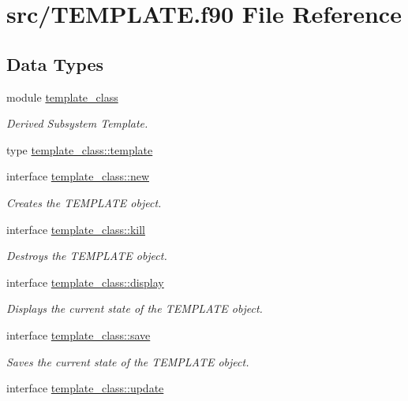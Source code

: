 \hypertarget{_t_e_m_p_l_a_t_e_8f90}{\section{src/\-T\-E\-M\-P\-L\-A\-T\-E.f90 File Reference}
\label{_t_e_m_p_l_a_t_e_8f90}
}
\subsection*{Data Types}
\begin{DoxyCompactItemize}
\item 
module \hyperlink{classtemplate__class}{template\-\_\-class}
\begin{DoxyCompactList}\small\item\em Derived Subsystem Template. \end{DoxyCompactList}\item 
type \hyperlink{structtemplate__class_1_1template}{template\-\_\-class\-::template}
\item 
interface \hyperlink{interfacetemplate__class_1_1new}{template\-\_\-class\-::new}
\begin{DoxyCompactList}\small\item\em Creates the T\-E\-M\-P\-L\-A\-T\-E object. \end{DoxyCompactList}\item 
interface \hyperlink{interfacetemplate__class_1_1kill}{template\-\_\-class\-::kill}
\begin{DoxyCompactList}\small\item\em Destroys the T\-E\-M\-P\-L\-A\-T\-E object. \end{DoxyCompactList}\item 
interface \hyperlink{interfacetemplate__class_1_1display}{template\-\_\-class\-::display}
\begin{DoxyCompactList}\small\item\em Displays the current state of the T\-E\-M\-P\-L\-A\-T\-E object. \end{DoxyCompactList}\item 
interface \hyperlink{interfacetemplate__class_1_1save}{template\-\_\-class\-::save}
\begin{DoxyCompactList}\small\item\em Saves the current state of the T\-E\-M\-P\-L\-A\-T\-E object. \end{DoxyCompactList}\item 
interface \hyperlink{interfacetemplate__class_1_1update}{template\-\_\-class\-::update}

\end{DoxyCompactItemize}
